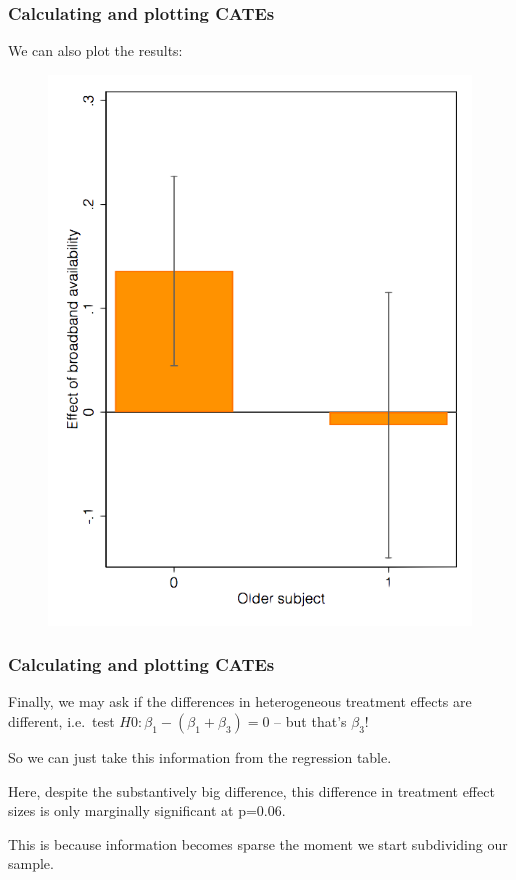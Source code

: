 \documentclass[12pt,english,dvipsnames,aspectratio=169,handout]{beamer}\usepackage[]{graphicx}\usepackage[]{xcolor}
\begin{document}
\begin{frame}
  \frametitle{Calculating and plotting CATEs}
\footnotesize

We can also plot the results:

	 \begin{figure} 
    \includegraphics[height=.65\textheight,keepaspectratio=true]{../04-figures/10/04-w10_binary}
    \end{figure}

\vspace{1cm}
\end{frame}



\begin{frame}
  \frametitle{Calculating and plotting CATEs}
\footnotesize

Finally, we may ask if the differences in heterogeneous treatment effects are different, i.e.\ test $H0: \beta_1-(\beta_1 + \beta_3) = 0$ -- but that's $\beta_3$!

So we can just take this information from the regression table.

Here, despite the substantively big difference, this difference in treatment effect sizes is only marginally significant at p=0.06. 

This is because information becomes sparse the moment we start subdividing our sample.

\vspace{2cm}
\end{frame}
\end{document}
